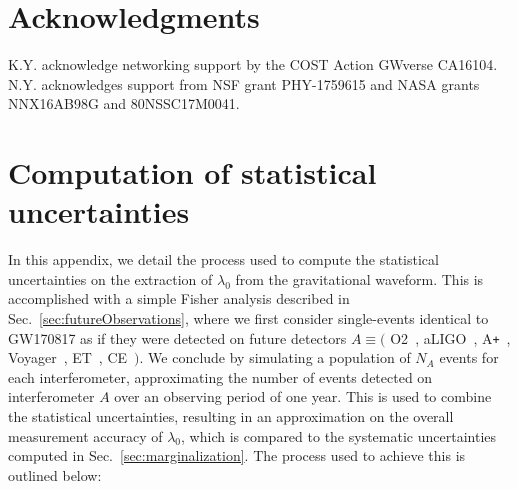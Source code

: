 \documentclass[prd,twocolumn,nofootinbib,superscriptaddress,amsmath,amssymb]{revtex4-1}
\begin{document}
\section*{Acknowledgments}\label{acknowledgments}
K.Y. acknowledge networking support by the COST Action GWverse CA16104.
N.Y. acknowledges support from  NSF grant PHY-1759615 and NASA grants NNX16AB98G and 80NSSC17M0041. 


\appendix

\section{Computation of statistical uncertainties}\label{app:stackingProcedure}

In this appendix, we detail the process used to compute the statistical uncertainties on the extraction of $\lambda_0$ from the gravitational waveform.
This is accomplished with a simple Fisher analysis described in Sec.~\ref{sec:futureObservations}, where we first consider single-events identical to GW170817 as if they were detected on future detectors $A \equiv ($ O2~\cite{aLIGO}, aLIGO~\cite{aLIGO}, A\texttt{+}~\cite{Ap_Voyager_CE}, Voyager~\cite{Ap_Voyager_CE}, ET~\cite{ET}, CE~\cite{Ap_Voyager_CE}$)$.
We conclude by simulating a population of $N_A$ events for each interferometer, approximating the number of events detected on interferometer $A$ over an observing period of one year.
This is used to combine the statistical uncertainties, resulting in an approximation on the overall measurement accuracy of $\lambda_0$, which is compared to the systematic uncertainties computed in Sec.~\ref{sec:marginalization}.
The process used to achieve this is outlined below:
\end{document}
